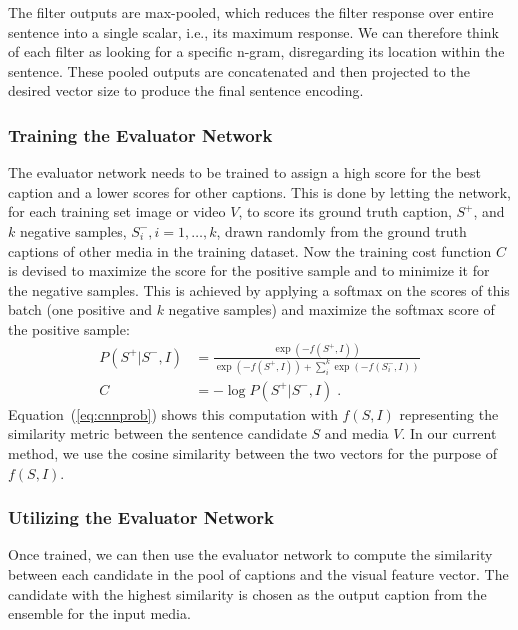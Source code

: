 The filter outputs are max-pooled, which reduces the filter response over entire
sentence into a single scalar, i.e., its maximum response. 
We can therefore think of each filter as looking for a specific n-gram,
disregarding its location within the sentence.
These pooled outputs are concatenated and then projected to the desired vector
size to produce the final sentence encoding.


\subsubsection{Training the Evaluator Network}

The evaluator network needs to be trained to assign a high score for the best
caption and a lower scores for other captions.
This is done by letting the network, for each training set image or video $V$,
to score its ground truth caption, $S^+$, and $k$ negative samples, $S_i^-,
i=1,\ldots,k$, drawn randomly from the ground truth captions of other media in
the training dataset.
Now the training cost function $C$ is devised to maximize the score for the
positive sample and to minimize it for the negative samples. 
This is achieved by applying a softmax on the scores of this batch (one positive
and $k$ negative samples) and maximize the softmax score of the positive sample:
\begin{align}
  \label{eq:cnnprob} 
  P(S^+|S^-,I) &= \frac{\exp(-f(S^+,I))}{\exp(-f(S^+,I)) +
           \sum\limits_i^k{\exp(-f(S_i^- ,I))}} \\
  C &= -\log P(S^+|S^-,I) \;.
\end{align}
Equation~(\ref{eq:cnnprob}) shows this computation with $f(S,I)$ representing
the similarity metric between the sentence candidate $S$ and media $V$.
In our current method, we use the cosine similarity between the two vectors for
the purpose of $f(S,I)$.


\subsubsection{Utilizing the Evaluator Network}

Once trained, we can then use the evaluator network to compute the similarity
between each candidate in the pool of captions and the visual feature vector. 
The candidate with the highest similarity is chosen as the output caption from
the ensemble for the input media.

